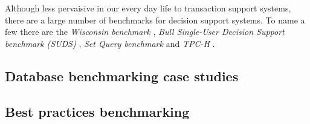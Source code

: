 Although less pervaisive in our every day life to transaction support systems,
there are a large number of benchmarks for decision support systems. To name a
few there are the \emph{Wisconsin benchmark} \cite{Wisconsin}, \emph{Bull Single-User Decision
Support benchmark (SUDS)} \cite{PractitionersIntroduction}, \emph{Set Query
benchmark} \cite{SetQueryBenchmark} and \emph{TPC-H} \cite{TPC-H}. 

\subsection{Database benchmarking case studies}


\subsection{Best practices benchmarking}
